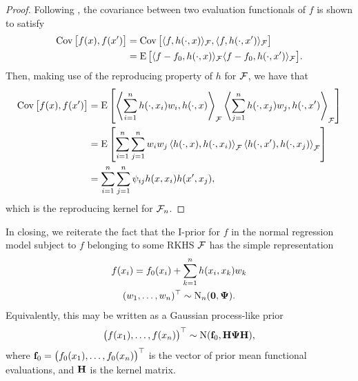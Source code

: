 \begin{proof}
  Following , the covariance between two evaluation functionals of $f$ is shown to satisfy 
  \begin{align*}
    \operatorname{Cov}\big[f(x),f(x')\big] 
    &= \operatorname{Cov}\big[\langle f,h(\cdot,x)\rangle_{{\mathcal F}}, \langle f,h(\cdot,x')\rangle_{{\mathcal F}} \big] \\
    &= \operatorname{E}\big[\langle f-f_0,h(\cdot,x)\rangle_{{\mathcal F}}\langle f-f_0,h(\cdot,x')\rangle_{{\mathcal F}} \big].
  \end{align*}
  Then, making use of the reproducing property of $h$ for ${\mathcal F}$, we have that
  \begin{align*}
    \operatorname{Cov}\big[f(x),f(x')\big]
    &= \operatorname{E} \left[ 
    \left\langle \sum_{i=1}^n h(\cdot,x_i)w_i, h(\cdot,x) \right\rangle_{{\mathcal F}} 
    \left\langle \sum_{j=1}^n h(\cdot,x_j)w_j, h(\cdot,x') \right\rangle_{{\mathcal F}} 
    \right] \\
    &= \operatorname{E} \left[ 
    \sum_{i=1}^n\sum_{j=1}^n w_iw_j \left\langle  h(\cdot,x), h(\cdot,x_i) \right\rangle_{{\mathcal F}} 
     \left\langle h(\cdot,x'), h(\cdot,x_j)\right\rangle_{{\mathcal F}} 
    \right] \\
    &= \sum_{i=1}^n\sum_{j=1}^n \psi_{ij} h(x,x_i) h(x',x_j),
  \end{align*}
  which is the reproducing kernel for ${\mathcal F}_n$.
\end{proof}

In closing, we reiterate the fact that the I-prior for $f$ in the normal regression model subject to $f$ belonging to some RKHS ${\mathcal F}$ has the simple representation
\begin{align}\label{eq:iprior2}
  \begin{gathered}
    f(x_i) = f_0(x_i) + \sum_{k=1}^n h(x_i,x_k)w_k \\
    (w_1,\dots,w_n)^\top \sim \operatorname{N}_n({\mathbf 0},{\bm\Psi}).
  \end{gathered}
\end{align}
Equivalently, this may be written as a Gaussian process-like prior 
\begin{align}\label{eq:iprior3}
  \big(f(x_1),\dots,f(x_n) \big)^\top \sim \operatorname{N}({\mathbf f}_0,{\mathbf H}{\bm\Psi}{\mathbf H}),
\end{align}
where ${\mathbf f}_0 = \big(f_0(x_1),\dots,f_0(x_n) \big)^\top$ is the vector of prior mean functional evaluations, and ${\mathbf H}$ is the kernel matrix.